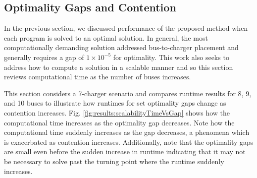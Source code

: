\subsection{Optimality Gaps and Contention}
In the previous section, we discussed performance of the proposed method when each program is solved to an optimal solution. In general, the most computationally demanding solution addressed bus-to-charger placement and generally requires a gap of $1\times10^{-5}$ for optimality. This work also seeks to address how to compute a solution in a scalable manner and so this section reviews computational time as the number of buses increases.  
\par This section considers a 7-charger scenario and compares runtime results for 8, 9, and 10 buses to illustrate how runtimes for set optimality gaps change as contention increases. Fig. \ref{fig:results:scalabilityTimeVsGap} shows how the computational time increases as the optimality gap decreases. Note how the computational time suddenly increases as the gap decreases, a phenomena which is exacerbated as contention increases. Additionally, note that the optimality gaps are small even before the sudden increase in runtime indicating that it may not be necessary to solve past the turning point where the runtime suddenly increases. 
 

